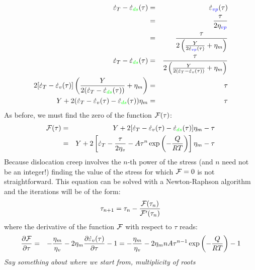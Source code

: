 \begin{enumerate}
\begin{eqnarray}
\dot\varepsilon_T - \dot{\varepsilon}_{\color{green}ds}(\tau) 
&=& \dot\varepsilon_{\color{blue}vp}(\tau)  \nonumber\\
&=& \frac{\tau}{2 \eta_{\color{blue}vp}}  \nonumber\\
&=& \frac{\tau}{2 \left( \frac{Y}{2\dot\varepsilon_{\color{blue}vp}(\tau)} + \eta_m  \right)} 
\nonumber\\
\dot\varepsilon_T -  \dot{\varepsilon}_{\color{green}ds}(\tau) 
&=&
\frac{\tau}{2 \left( \frac{Y}{2 (\dot\varepsilon_T -\dot{\varepsilon}_v(\tau)  )} + \eta_m  \right)} \nonumber 
\\
2 [\dot\varepsilon_T -\dot{\varepsilon}_v(\tau)  ]
 \left( \frac{Y}{2 (\dot\varepsilon_T -\dot{\varepsilon}_{\color{green}ds}(\tau) )} + \eta_m  \right) &=& \tau 
\nonumber\\
Y + 2 (\dot\varepsilon_T - \dot{\varepsilon}_v(\tau)  -\dot{\varepsilon}_{\color{green}ds}(\tau) ) \eta_m  &=& \tau \nonumber 
\end{eqnarray}
As before, we must find the zero of the function ${\cal F}(\tau)$: 
\begin{eqnarray}
{\cal F}(\tau) 
&=& Y + 2 [\dot\varepsilon_T -\dot{\varepsilon}_v(\tau)   -\dot{\varepsilon}_{\color{green}ds}(\tau) ]\eta_m -\tau \nonumber\\
&=& Y + 2 \left[ 
\dot\varepsilon_T -\frac{\tau}{2\eta_v} -A \tau^n \exp \left(-\frac{Q}{RT}\right) 
\right]\eta_m -\tau \nonumber
\end{eqnarray}
Because dislocation creep involves the $n$-th power of the stress (and $n$ need not be an integer!) 
finding the value of the stress for which ${\cal F}=0$ is not straightforward.
This equation can be solved with a Newton-Raphson algorithm
and the iterations will be of the form:
\[
\tau_{n+1} = \tau_n - \frac{{\cal F}(\tau_n)}{{\cal F}'(\tau_n)}
\]
where the derivative of the function ${\cal F}$ with respect to $\tau$ reads:
\begin{eqnarray}
\frac{\partial {\cal F}}{\partial \tau} 
&=& -\frac{\eta_m}{\eta_v} -2 \eta_m \frac{\partial  \dot\varepsilon_{v}(\tau) }{\partial \tau}    - 1 
= -\frac{\eta_m}{\eta_v}-2 \eta_m n A \tau^{n-1} \exp \left(-\frac{Q}{RT}\right) -1 
\end{eqnarray}
{\it Say something about where we start from, multiplicity of roots}


\end{enumerate}
